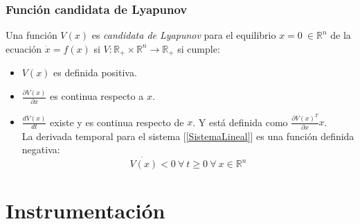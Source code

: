 \documentclass[12pt,spanish,lettersize]{report}
\begin{document}
\subsection{Funci\'on candidata de Lyapunov}
Una funci\'on $V(x)$ es \emph{candidata de Lyapunov} para el equilibrio $x=0\ \in\mathbb{R}^n$ de la ecuaci\'on $\dot{x}=f(x)$ si $V:\mathbb{R}_+\times\mathbb{R}^n\rightarrow\mathbb{R}_+$ si cumple:
\begin{itemize}
\item $V(x)$ es definida positiva.
\item $\frac{\partial V(x)}{\partial x}$ es continua respecto a $x$.
\item $\frac{dV(x)}{dt}$ existe y es continua respecto de $x$. Y est\'a definida como $\frac{\partial V(x)^T}{\partial x}x$.\\
La derivada temporal para el sistema [\ref{SistemaLineal}] es una funci\'on definida negativa:
\begin{equation}
\dot{V(x)}<0\ \forall\ t\ge 0 \ \forall\ x\in\mathbb{R}^n
\end{equation}
\end{itemize}
\chapter{Instrumentaci\'on}
\end{document}
